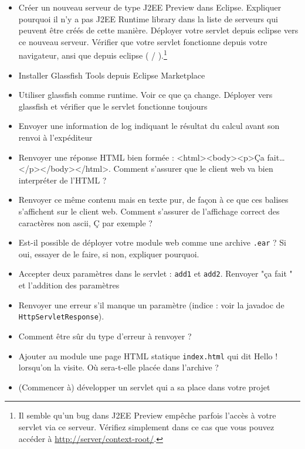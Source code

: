 \documentclass[english, french]{beamer}
\begin{document}
\begin{frame}[allowframebreaks]
\begin{itemize}
		\item Créer un nouveau serveur de type J2EE Preview dans Eclipse. Expliquer pourquoi il n’y a pas \og{}J2EE Runtime library\fg{} dans la liste de serveurs qui peuvent être créés de cette manière. Déployer votre servlet depuis eclipse vers ce nouveau serveur. Vérifier que votre servlet fonctionne depuis votre navigateur, ansi que depuis eclipse ( / ).\footnote{Il semble qu’un bug dans J2EE Preview empêche parfois l’accès à votre servlet via ce serveur. Vérifiez simplement dans ce cas que vous pouvez accéder à \url{http://server/context-root/}.}
		\item Installer Glassfish Tools depuis Eclipse Marketplace
		\item Utiliser glassfish comme runtime. Voir ce que ça change. Déployer vers glassfish et vérifier que le servlet fonctionne toujours
		\item Envoyer une information de log indiquant le résultat du calcul avant son renvoi à l’expéditeur
		\item Renvoyer une réponse HTML bien formée : <html><body><p>Ça fait…</p></body></html>. Comment s’assurer que le client web va bien interpréter de l’HTML ?
		\item Renvoyer ce même contenu mais en texte pur, de façon à ce que ces balises s’affichent sur le client web. Comment s’assurer de l’affichage correct des caractères non ascii, Ç par exemple ?
		\item[*\footnote{Les astérisques indiquent des exercices plus difficiles, à essayer de faire pour gagner des points de prestige.}] Est-il possible de déployer votre module web comme une archive \texttt{.ear} ? Si oui, essayer de le faire, si non, expliquer pourquoi.
		\item Accepter deux paramètres dans le servlet : \texttt{add1} et \texttt{add2}. Renvoyer "ça fait " et l’addition des paramètres
		\item Renvoyer une erreur s’il manque un paramètre (indice : voir la javadoc de \texttt{HttpServletResponse}).
		\item[*] Comment être sûr du type d’erreur à renvoyer ?
		\item Ajouter au module une page HTML statique \texttt{index.html} qui dit \og{}Hello !\fg{} lorsqu’on la visite. Où sera-t-elle placée dans l’archive ?
		\item (Commencer à) développer un servlet qui a sa place dans votre projet
	\end{itemize}
\end{frame}
\end{document}
